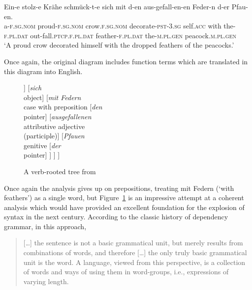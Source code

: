 \documentclass[output=paper]{langscibook}
\begin{document}
\begin{exe}
	\ex \label{ex:2}
	\gll Ein-e stolz-e Krähe schmück-t-e sich mit d-en aus-gefall-en-en Feder-n d-er Pfau-en.\\
	a\textsc{-f.sg.nom} proud\textsc{-f.sg.nom} crow\textsc{.f.sg.nom} decorate\textsc{-pst}\textsc{-3.sg} self\textsc{.acc} with the\textsc{-f.pl.dat} out-fall\textsc{.ptcp.f.pl.dat} feather\textsc{-f.pl.dat} the\textsc{-m.pl.gen} peacock\textsc{.m.pl.gen}\\
	\glt ‘A proud crow decorated himself with the dropped feathers of the peacocks.’
\end{exe}

Once again, the original diagram includes function terms which are translated in this diagram into English.

\begin{figure}
	\centering
\begin{forest}
[\emph{schmückte}\\finite verb
	[\emph{Krähe}\\subject word
		[\emph{eine}\\counter]
		[\emph{stolze}\\attributive adjective]
	]
	[\emph{sich}\\object]
	[\emph{mit Federn}\\case with preposition
		[\emph{den}\\pointer]
		[\emph{ausgefallenen}\\attributive adjective\\(participle)]
		[\emph{Pfauen}\\genitive
			[\emph{der}\\pointer]
		]
	]
]
\end{forest}
	\caption{A verb-rooted tree from \citealp{Kern1884a-u}}
	\label{fig:4}
\end{figure}


Once again the analysis gives up on prepositions, treating mit Federn (‘with feathers’) as a single word, but Figure~\ref{fig:4} is an impressive attempt at a coherent analysis which would have provided an excellent foundation for the explosion of syntax in the next century. According to the classic history of dependency grammar, in this approach,

\begin{quotation}
	[\dots] the sentence is not a basic grammatical unit, but merely results from combinations of words, and therefore [\dots] the only truly basic grammatical unit is the word. A language, viewed from this perspective, is a collection of words and ways of using them in word-groups, i.e., expressions of varying length. \citep[21]{Percival1976}
\end{quotation}
\end{document}
